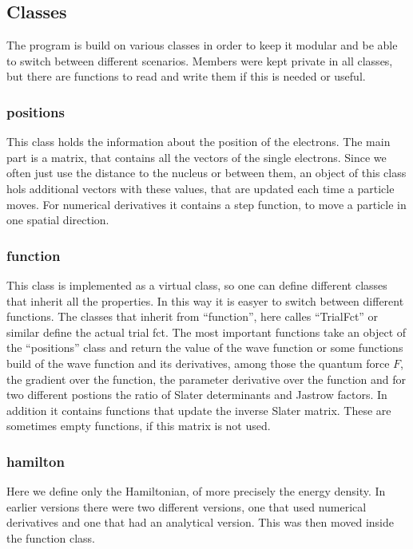 \documentclass[a4paper,10pt]{article}
\begin{document}
\subsection{Classes}

The program is build on  various classes in order to keep it modular and be able to switch between different scenarios. 
Members were kept private in all classes, but there are functions to read and write them if this is needed or useful. 

\subsubsection{positions}

This class holds the information about the position of the electrons. 
The main part is a matrix, that contains all the vectors of the single electrons. 
Since we often just use the distance to the nucleus or between them, an object of 
this class hols additional vectors with these values, that are updated each time a particle moves. 
For numerical derivatives it contains a step function, to move a particle in one spatial direction. 

\subsubsection{function}

This class is implemented as a virtual class, so one can define different classes that inherit all the properties. 
In this way it is easyer to switch between different functions. The classes that inherit from ``function'', here calles 
``TrialFct'' or similar define the actual trial fct.
The most important functions take an object of the ``positions'' class and return the value of the wave function or 
some functions build of the wave function and its derivatives, among those the quantum force $F$, the gradient over the function,
the parameter derivative over the function
and for two different postions the ratio of Slater determinants and Jastrow factors.
In addition it contains functions that update the inverse Slater matrix. These are sometimes empty functions, if this matrix is not used. 



\subsubsection{hamilton}

Here we define only the Hamiltonian, of more precisely the energy density.
In earlier versions there were two different versions, one that used numerical derivatives and one that had an analytical version.
This was then moved inside the function class.
\end{document}
